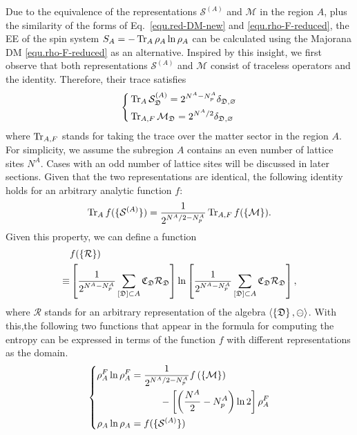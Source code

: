 Due to the equivalence of the representations $\mathcal{S}^{(A)}$ and $\mathcal{M}$ in the region $A$, plus the similarity of the forms of Eq.~\eqref{equ.red-DM-new} and \eqref{equ.rho-F-reduced}, the EE of the spin system ${S_A = -\Tr_A\rho_A\ln\rho_A}$ can be calculated using the Majorana DM \eqref{equ.rho-F-reduced} as an alternative. Inspired by this insight, we first observe that both representations $\mathcal{S}^{(A)}$ and $\mathcal{M}$ consist of traceless operators and the identity. Therefore, their trace satisfies 
\begin{equation}\label{equ.U-V-trace-relation}
    \left\{
\begin{aligned}
&\Tr_{A} \mathcal{S}^{(A)}_{\mathfrak{D}} = 2^{N^A-N^A_p}\delta_{\mathfrak{D},\varnothing} \\
& \Tr_{A,F} \mathcal{M}_{\mathfrak{D}} = 2^{N^A/2}\delta_{\mathfrak{D},\varnothing}
\end{aligned}
\right.
\end{equation}
where $\Tr_{A,F}$ stands for taking the trace over the matter sector in the region $A$. For simplicity, we assume the subregion $A$ contains an even number of lattice sites $N^A$. Cases with an odd number of lattice sites will be discussed in later sections. Given that the two representations are identical, the following identity holds for an arbitrary analytic function $f$: 
\begin{equation}\label{equ.identity}
    \Tr_A f(\{\mathcal{S}^{(A)}\}) = \frac{1}{2^{N^A/2 - N^A_p}}\Tr_{A,F} f(\left\{ \mathcal{M} \right\}).
\end{equation}
Given this property, we can define a function
\begin{align*}
    &f(\left\{ \mathcal{R} \right\}) \\
    \equiv& \left[ \frac{1}{2^{N^A-N^A_p}}\sum_{[\mathfrak{D}]\subset A}\mathfrak{C}_\mathfrak{D}\mathcal{R}_{\mathfrak{D}} \right]\ln\left[ \frac{1}{2^{N^A-N^A_p}}\sum_{[\mathfrak{D}]\subset A}\mathfrak{C}_\mathfrak{D}\mathcal{R}_{\mathfrak{D}} \right],
\end{align*}
where $\mathcal{R}$ stands for an arbitrary representation of the algebra $\left\langle \left\{ \mathfrak{D} \right\},\ominus \right\rangle$. With this,{the following two functions that appear in the formula for computing the entropy can be expressed in terms of the function $f$ with different representations as the domain}.
\begin{equation}\label{eq:rholnrho}
    \left\{
    \begin{aligned}
    \rho^F_A\ln\rho_A^F &= \frac{1}{2^{N^A/2-N^A_p}} f\left( \left\{ \mathcal{M} \right\} \right)  \\
        &\hspace{3em} - \left[ \left( \frac{N^A}{2}-N^A_p \right)\ln 2 \right]\rho^F_A
        \\
    \rho_A\ln\rho_A &= f(\{\mathcal{S}^{(A)}\})
    \end{aligned}
    \right.
\end{equation}

